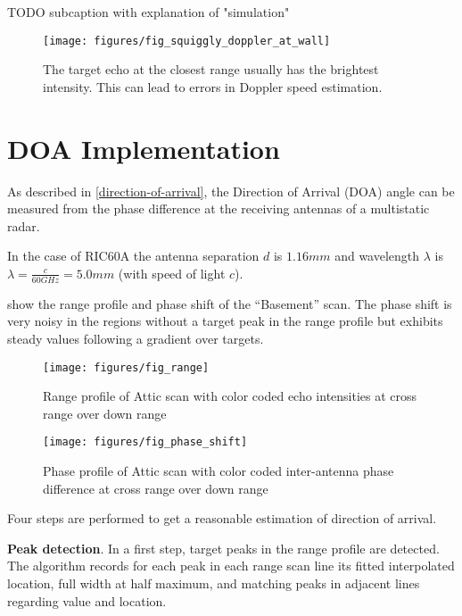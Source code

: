 TODO subcaption with explanation of "simulation"

\begin{figure}[htbp]
    \centering
    \texttt{[image: figures/fig\_squiggly\_doppler\_at\_wall]}
    \caption{The target echo at the closest range usually has the brightest intensity. This can lead to errors in Doppler speed estimation.}
    \label{fig:fig_squiggly_doppler_at_wall}
\end{figure}

\section{DOA Implementation}\label{doa-implementation}

As described in \cref{direction-of-arrival}, the Direction of Arrival (DOA) angle can be
measured from the phase difference at the receiving antennas of a
multistatic radar.

In the case of RIC60A the antenna separation \(d\) is \(1.16mm\) and
wavelength \(\lambda\) is \(\lambda=\frac{c}{60GHz}=5.0mm\) (with speed
of light \(c\)).

 show the range profile and phase shift of the
``Basement'' scan. The phase shift is very noisy in the regions without
a target peak in the range profile but exhibits steady values following
a gradient over targets.

\begin{figure}[htbp]
    \centering
    \texttt{[image: figures/fig\_range]}
    \caption{Range profile of Attic scan with color coded echo intensities at cross range over down range}
    \label{fig:fig_range}
\end{figure}

\begin{figure}[htbp]
    \centering
    \texttt{[image: figures/fig\_phase\_shift]}
    \caption{Phase profile of Attic scan with color coded inter-antenna phase difference at cross range over down range}
    \label{fig:fig_phase_shift}
\end{figure}

Four steps are performed to get a reasonable estimation of direction of
arrival.

\textbf{Peak detection}. In a first step, target peaks in the
range profile are detected. The algorithm records for each peak in each
range scan line its fitted interpolated location, full width at half
maximum, and matching peaks in adjacent lines regarding value and
location.

